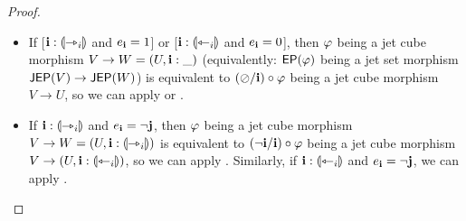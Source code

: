 \documentclass[a4paper]{article}
\begin{document}
\begin{proof}
\begin{itemize}
		\item If [$\mathbf{i} : {\llparenthesis \rightarrowtriangle_i \rrparenthesis}$ and $e_{\mathbf{i}} = 1$] or [$\mathbf{i} : {\llparenthesis \leftarrowtriangle_i \rrparenthesis}$ and $e_{\mathbf{i}} = 0$], then $\varphi$ being a jet cube morphism $V \to W = (U, \mathbf{i} : \_)$ (equivalently: $\mathsf{EP}(\varphi)$ being a jet set morphism $\mathsf{JEP}(V) \to \mathsf{JEP}(W)$) is equivalent to $(\oslash / \mathbf{i}) \circ \varphi$ being a jet cube morphism $V \to U$, so we can apply  or .
		
		\item If $\mathbf{i} : {\llparenthesis \rightarrowtriangle_i \rrparenthesis}$ and $e_{\mathbf{i}} = \lnot \mathbf{j}$, then $\varphi$ being a jet cube morphism $V \to W = (U, \mathbf{i} : {\llparenthesis \rightarrowtriangle_i \rrparenthesis})$ is equivalent to $(\lnot \mathbf{i} / \mathbf{i}) \circ \varphi$ being a jet cube morphism $V \to (U, \mathbf{i} : {\llparenthesis \leftarrowtriangle_i \rrparenthesis})$, so we can apply .
		Similarly, if $\mathbf{i} : {\llparenthesis \leftarrowtriangle_i \rrparenthesis}$ and $e_{\mathbf{i}} = \lnot \mathbf{j}$, we can apply .
		

\end{itemize}
\end{proof}
\end{document}
